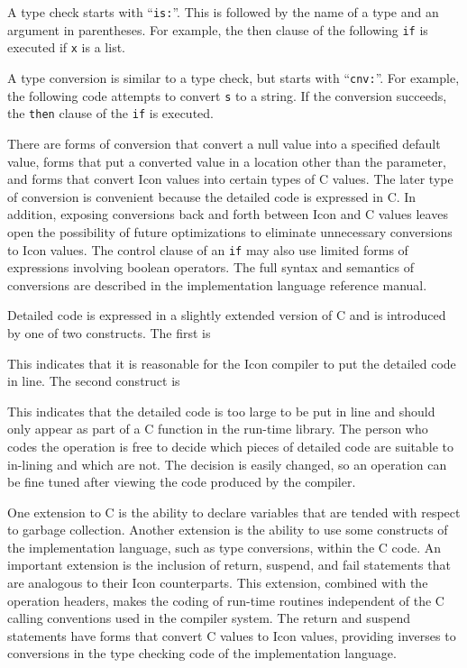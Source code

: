 A type check starts with ``\texttt{is:}''. This is followed by the
name of a type and an argument in parentheses.  For example, the then
clause of the following \texttt{if} is executed if \texttt{x} is a
list.


A type conversion is similar to a type check, but starts with
``\texttt{cnv:}''. For example, the following code attempts to convert
\texttt{s} to a string. If the conversion succeeds, the \texttt{then}
clause of the \texttt{if} is executed.


There are forms of conversion that convert a null value into a
specified default value, forms that put a converted value in a
location other than the parameter, and forms that convert Icon values
into certain types of C values. The later type of conversion is
convenient because the detailed code is expressed in C. In addition,
exposing conversions back and forth between Icon and C values leaves
open the possibility of future optimizations to eliminate unnecessary
conversions to Icon values. The control clause of an \texttt{if} may
also use limited forms of expressions involving boolean operators. The
full syntax and semantics of conversions are described in the
implementation language reference manual.

Detailed code is expressed in a slightly extended version of C and is
introduced by one of two constructs. The first is


This indicates that it is reasonable for the Icon compiler to put the
detailed code in line. The second construct is


This indicates that the detailed code is too large to be put in line
and should only appear as part of a C function in the run-time
library. The person who codes the operation is free to decide which
pieces of detailed code are suitable to in-lining and which are
not. The decision is easily changed, so an operation can be fine tuned
after viewing the code produced by the compiler.

One extension to C is the ability to declare variables that are tended
with respect to garbage collection. Another extension is the ability
to use some constructs of the implementation language, such as type
conversions, within the C code. An important extension is the
inclusion of return, suspend, and fail statements that are analogous
to their Icon counterparts. This extension, combined with the
operation headers, makes the coding of run-time routines independent
of the C calling conventions used in the compiler system. The return
and suspend statements have forms that convert C values to Icon
values, providing inverses to conversions in the type checking code of
the implementation language.

